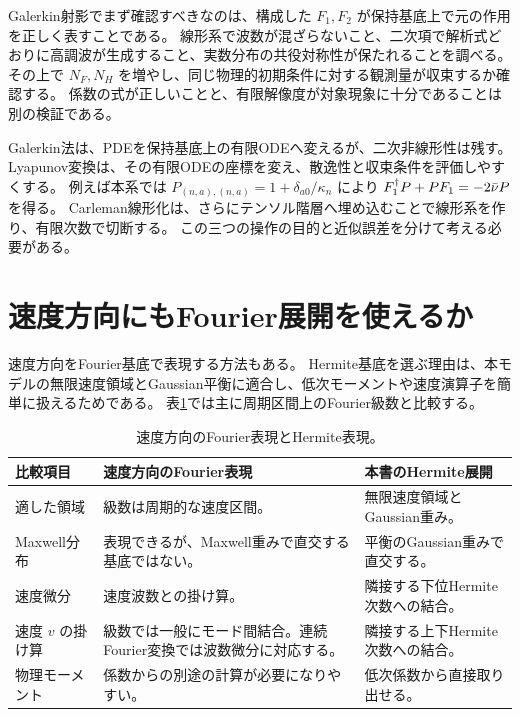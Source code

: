 Galerkin射影でまず確認すべきなのは、構成した $F_1,F_2$ が保持基底上で元の作用を正しく表すことである。
線形系で波数が混ざらないこと、二次項で解析式どおりに高調波が生成すること、実数分布の共役対称性が保たれることを調べる。
その上で $N_F,N_H$ を増やし、同じ物理的初期条件に対する観測量が収束するか確認する。
係数の式が正しいことと、有限解像度が対象現象に十分であることは別の検証である。

\begin{notebox}
Galerkin法は、PDEを保持基底上の有限ODEへ変えるが、二次非線形性は残す。
Lyapunov変換は、その有限ODEの座標を変え、散逸性と収束条件を評価しやすくする。
例えば本系では $P_{(n,a),(n,a)}=1+\delta_{a0}/\kappa_n$ により
$F_1^\dagger P+PF_1=-2\bar\nu P$ を得る。
Carleman線形化は、さらにテンソル階層へ埋め込むことで線形系を作り、有限次数で切断する。
この三つの操作の目的と近似誤差を分けて考える必要がある。
\end{notebox}

\section{速度方向にもFourier展開を使えるか}
速度方向をFourier基底で表現する方法もある。
Hermite基底を選ぶ理由は、本モデルの無限速度領域とGaussian平衡に適合し、低次モーメントや速度演算子を簡単に扱えるためである。
表\ref{tab:velocity-bases}では主に周期区間上のFourier級数と比較する。

\begin{table}[htbp]
\centering\small
\caption{速度方向のFourier表現とHermite表現。}
\label{tab:velocity-bases}
\begin{tabularx}{\textwidth}{lXX}
\toprule 比較項目 & 速度方向のFourier表現 & 本書のHermite展開 \\\midrule
適した領域 & 級数は周期的な速度区間。 & 無限速度領域とGaussian重み。\\
Maxwell分布 & 表現できるが、Maxwell重みで直交する基底ではない。 & 平衡のGaussian重みで直交する。\\
速度微分 & 速度波数との掛け算。 & 隣接する下位Hermite次数への結合。\\
速度 $v$ の掛け算 & 級数では一般にモード間結合。連続Fourier変換では波数微分に対応する。 & 隣接する上下Hermite次数への結合。\\
物理モーメント & 係数からの別途の計算が必要になりやすい。 & 低次係数から直接取り出せる。\\
\bottomrule
\end{tabularx}
\end{table}


